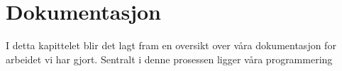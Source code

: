 \chapter{Dokumentasjon}
\thispagestyle{fancy}

I detta kapittelet blir det lagt fram en oversikt over våra dokumentasjon for arbeidet vi har gjort. 
Sentralt i denne prosessen ligger våra programmering